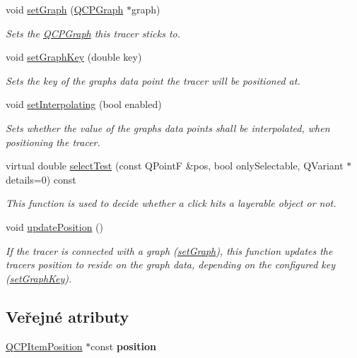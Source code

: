 \begin{DoxyCompactItemize}
void \hyperlink{classQCPItemTracer_af5886f4ded8dd68cb4f3388f390790c0}{set\+Graph} (\hyperlink{classQCPGraph}{Q\+C\+P\+Graph} $\ast$graph)
\begin{DoxyCompactList}\small\item\em Sets the \hyperlink{classQCPGraph}{Q\+C\+P\+Graph} this tracer sticks to. \end{DoxyCompactList}\item 
void \hyperlink{classQCPItemTracer_a6840143b42f3b685cedf7c6d83a704c8}{set\+Graph\+Key} (double key)
\begin{DoxyCompactList}\small\item\em Sets the key of the graph\textquotesingle{}s data point the tracer will be positioned at. \end{DoxyCompactList}\item 
void \hyperlink{classQCPItemTracer_a6c244a9d1175bef12b50afafd4f5fcd2}{set\+Interpolating} (bool enabled)
\begin{DoxyCompactList}\small\item\em Sets whether the value of the graph\textquotesingle{}s data points shall be interpolated, when positioning the tracer. \end{DoxyCompactList}\item 
virtual double \hyperlink{classQCPItemTracer_ae71f3728421c83c188c117279ca050fd}{select\+Test} (const Q\+Point\+F \&pos, bool only\+Selectable, Q\+Variant $\ast$details=0) const 
\begin{DoxyCompactList}\small\item\em This function is used to decide whether a click hits a layerable object or not. \end{DoxyCompactList}\item 
void \hyperlink{classQCPItemTracer_a5b90296109e36384aedbc8908a670413}{update\+Position} ()
\begin{DoxyCompactList}\small\item\em If the tracer is connected with a graph (\hyperlink{classQCPItemTracer_af5886f4ded8dd68cb4f3388f390790c0}{set\+Graph}), this function updates the tracer\textquotesingle{}s {\itshape position} to reside on the graph data, depending on the configured key (\hyperlink{classQCPItemTracer_a6840143b42f3b685cedf7c6d83a704c8}{set\+Graph\+Key}). \end{DoxyCompactList}\end{DoxyCompactItemize}
\subsection*{Veřejné atributy}
\begin{DoxyCompactItemize}
\item 
\hypertarget{classQCPItemTracer_a69917e2fdb2b3a929c196958feee7cbe}{}\hyperlink{classQCPItemPosition}{Q\+C\+P\+Item\+Position} $\ast$const {\bfseries position}\label{classQCPItemTracer_a69917e2fdb2b3a929c196958feee7cbe}

\end{DoxyCompactItemize}
